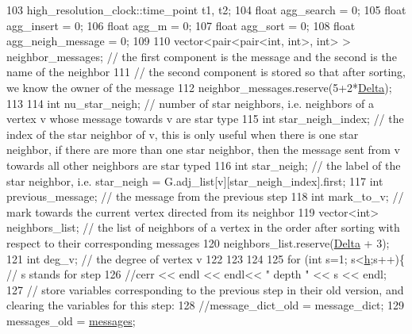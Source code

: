 \begin{DoxyCode}
103   high\_resolution\_clock::time\_point t1, t2; 
104   \textcolor{keywordtype}{float} agg\_search = 0;
105   \textcolor{keywordtype}{float} agg\_insert = 0;
106   \textcolor{keywordtype}{float} agg\_m = 0;
107   \textcolor{keywordtype}{float} agg\_sort = 0;
108   \textcolor{keywordtype}{float} agg\_neigh\_message = 0;
109 
110   vector<pair<pair<int, int>, \textcolor{keywordtype}{int}> > neighbor\_messages; \textcolor{comment}{// the first component is the message and the
       second is the name of the neighbor}
111   \textcolor{comment}{// the second component is stored so that after sorting, we know the owner of the message}
112   neighbor\_messages.reserve(5+2*\hyperlink{classgraph__message_a45dfd061b7bc73572e5132fbf66efd55}{Delta});
113 
114   \textcolor{keywordtype}{int} nu\_star\_neigh; \textcolor{comment}{// number of star neighbors, i.e. neighbors of a vertex v whose message towards v are
       star type}
115   \textcolor{keywordtype}{int} star\_neigh\_index; \textcolor{comment}{// the index of the star neighbor of v, this is only useful when there is one star
       neighbor, if there are more than one star neighbor, then the message sent from v towards all other neighbors
       are star typed}
116   \textcolor{keywordtype}{int} star\_neigh; \textcolor{comment}{// the label of the star neighbor, i.e. star\_neigh =
       G.adj\_list[v][star\_neigh\_index].first;}
117   \textcolor{keywordtype}{int} previous\_message; \textcolor{comment}{// the message from the previous step}
118   \textcolor{keywordtype}{int} mark\_to\_v; \textcolor{comment}{// mark towards the current vertex directed from its neighbor}
119   vector<int> neighbors\_list; \textcolor{comment}{// the list of neighbors of a vertex in the order after sorting with respect
       to their corresponding messages}
120   neighbors\_list.reserve(\hyperlink{classgraph__message_a45dfd061b7bc73572e5132fbf66efd55}{Delta} + 3);
121   \textcolor{keywordtype}{int} deg\_v; \textcolor{comment}{// the degree of vertex v }
122 
123 
124 
125   \textcolor{keywordflow}{for} (\textcolor{keywordtype}{int} s=1; s<\hyperlink{classgraph__message_a934d63ed7275c211e13c6fb68824ed46}{h};s++)\{ \textcolor{comment}{// s stands for step}
126     \textcolor{comment}{//cerr << endl << endl<< " depth " << s << endl;}
127     \textcolor{comment}{// store variables corresponding to the previous step in their old version, and clearing the variables
       for this step:}
128     \textcolor{comment}{//message\_dict\_old = message\_dict;}
129     messages\_old = \hyperlink{classgraph__message_af680c8a1755cf8d4aba389c1a3d6634e}{messages};

\end{DoxyCode}
